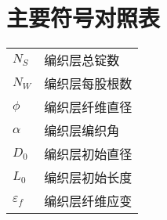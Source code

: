 
\chapter{主要符号对照表}
\label{chap:symb}
\newcommand{\ha}{Hachemi}
\newcommand{\hacite}{Hachemi\footnote{Hachemi H, Kebir H, Roelandt J M, et al. A study of the braided corrugated hoses: Behavior and life estimation[J]. Materials \& Design, 2011, 32(4): 1957-1966.}}
\newcommand{\aba}{ABAQUS}
\newcommand{\uma}{UMAT}
\begin{center}
	

\vspace{1cm}
\begin{tabular}{ll}
	$N_S$ \qquad & \hspace{5em}编织层总锭数 \\
	$N_W$ \qquad & \hspace{5em}编织层每股根数\\
	$ \phi $\qquad & \hspace{5em} 编织层纤维直径\\
	$ \alpha $\qquad & \hspace{5em} 编织层编织角\\
	$ D_0 $\qquad & \hspace{5em} 编织层初始直径\\
	$ L_0 $\qquad & \hspace{5em} 编织层初始长度\\
	$ \varepsilon_f $\qquad & \hspace{5em} 编织层纤维应变\\
\end{tabular}


\end{center}
